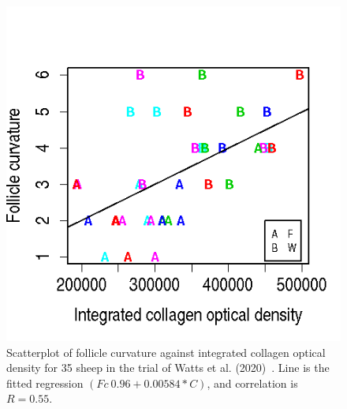 %

\begin{figure}[]
\centering
    \includegraphics[scale=0.60]{fccoll.png}
  \caption{Scatterplot of follicle curvature against integrated collagen optical density for 35 sheep in the trial of Watts et al. (2020)~\cite{watts-2020}. Line is the fitted regression $(Fc ~ 0.96 + 0.00584 * C)$, and correlation is  $R=0.55$.}
\vfill
  \label{fig:fccoll}
\end{figure}

%

